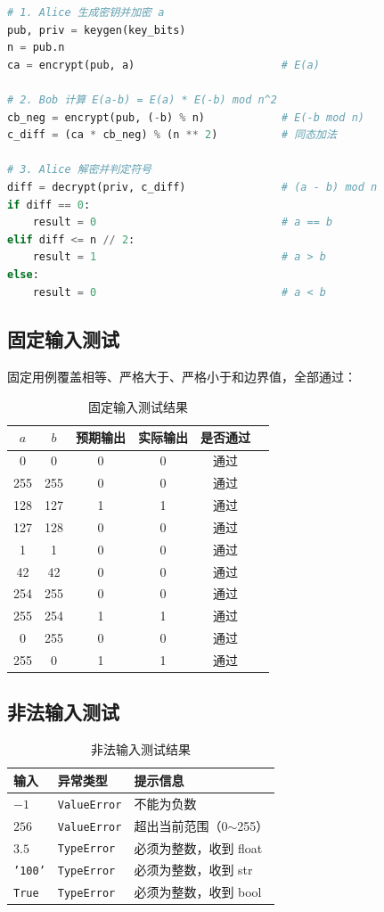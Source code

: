 \documentclass{SYSUReport}
\begin{document}
\begin{lstlisting}[language=Python, caption={Paillier 安全比较核心片段}]
# 1. Alice 生成密钥并加密 a
pub, priv = keygen(key_bits)
n = pub.n
ca = encrypt(pub, a)                       # E(a)

# 2. Bob 计算 E(a-b) = E(a) * E(-b) mod n^2
cb_neg = encrypt(pub, (-b) % n)            # E(-b mod n)
c_diff = (ca * cb_neg) % (n ** 2)          # 同态加法

# 3. Alice 解密并判定符号
diff = decrypt(priv, c_diff)               # (a - b) mod n
if diff == 0:
    result = 0                             # a == b
elif diff <= n // 2:
    result = 1                             # a > b
else:
    result = 0                             # a < b
\end{lstlisting}

\subsection{固定输入测试}

固定用例覆盖相等、严格大于、严格小于和边界值，全部通过：

\begin{table}[h]
\centering
\caption{固定输入测试结果}
\begin{tabular}{cccccc}
\toprule
$a$ & $b$ & 预期输出 & 实际输出 & 是否通过 \\
\midrule
0   & 0   & 0 & 0 & 通过 \\
255 & 255 & 0 & 0 & 通过 \\
128 & 127 & 1 & 1 & 通过 \\
127 & 128 & 0 & 0 & 通过 \\
1   & 1   & 0 & 0 & 通过 \\
42  & 42  & 0 & 0 & 通过 \\
254 & 255 & 0 & 0 & 通过 \\
255 & 254 & 1 & 1 & 通过 \\
0   & 255 & 0 & 0 & 通过 \\
255 & 0   & 1 & 1 & 通过 \\
\bottomrule
\end{tabular}
\end{table}

\subsection{非法输入测试}

\begin{table}[h]
\centering
\caption{非法输入测试结果}
\begin{tabular}{lll}
\toprule
输入 & 异常类型 & 提示信息 \\
\midrule
$-1$      & \texttt{ValueError} & 不能为负数 \\
$256$     & \texttt{ValueError} & 超出当前范围（0$\sim$255） \\
$3.5$     & \texttt{TypeError}  & 必须为整数，收到 float \\
\texttt{'100'} & \texttt{TypeError} & 必须为整数，收到 str \\
\texttt{True}  & \texttt{TypeError} & 必须为整数，收到 bool \\
\bottomrule
\end{tabular}
\end{table}
\end{document}
